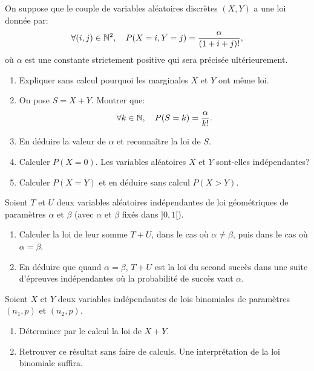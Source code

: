 \documentclass[a4paper,12pt,reqno]{amsart}
\begin{document}
\begin{exo}

  On suppose que le couple de variables aléatoires discrètes $(X,Y)$ a
  une loi donnée par:
    $$
      \forall (i,j)\in\mathbb{N}^{2},\quad P(X=i, Y=j)=\frac{\alpha}{(1+i+j)!},
    $$
  où $\alpha$ est une constante strictement positive qui sera précisée ultérieurement.
  \begin{enumerate}
    \item Expliquer sans  calcul pourquoi les marginales $X$ et $Y$ ont même loi.
    \item On pose $S=X+Y$. Montrer que:
      $$
        \forall k\in\mathbb{N},\quad P(S=k)=\frac{\alpha}{k!}.
      $$
    \item En déduire la valeur de $\alpha$ et reconnaître la loi de $S$.
    \item Calculer $P(X=0)$. Les variables aléatoires $X$ et $Y$ sont-elles indépendantes?
    \item Calculer $P(X=Y)$ et en déduire sans calcul $P(X>Y)$.
  \end{enumerate}

\end{exo}

\begin{exo}

  Soient $T$ et $U$  deux variables aléatoires indépendantes de loi géométriques de paramètres $\alpha$ et $\beta$ (avec $\alpha$ et $\beta$ fixés dans $]0,1[$).
  \begin{enumerate}
    \item Calculer la loi de leur somme $T+U$, dans le cas où $\alpha\neq\beta$, puis dans le cas où $\alpha=\beta$.
    \item En déduire que quand $\alpha=\beta$, $T+U$ est la loi du second succès dans une suite d'épreuves indépendantes où la probabilité de succès vaut $\alpha$.
  \end{enumerate}

\end{exo}

\begin{exo}

  Soient $X$ et $Y$ deux variables indépendantes de lois  binomiales de paramètres $(n_1,p)$ et $(n_2,p)$.
  \begin{enumerate}
    \item Déterminer par le calcul la loi de $X+Y$.
    \item Retrouver ce résultat sans faire de calculs. Une interprétation de la loi binomiale suffira.
  \end{enumerate}

\end{exo}
\end{document}
